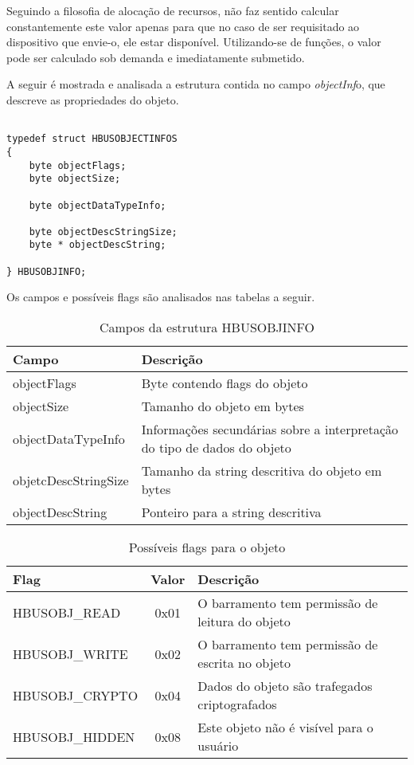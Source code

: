 Seguindo a filosofia de alocação de recursos, não faz sentido calcular constantemente este valor apenas para que no caso de ser requisitado ao dispositivo que envie-o, ele estar disponível. Utilizando-se de funções, o valor pode ser calculado sob demanda e imediatamente submetido.

\vskip1cm

A seguir é mostrada e analisada a estrutura contida no campo \textit{objectInf}o, que descreve as propriedades do objeto.

\pagebreak

\begin{verbatim}

typedef struct HBUSOBJECTINFOS
{
	byte objectFlags;
	byte objectSize;
	
	byte objectDataTypeInfo;
	
	byte objectDescStringSize;
	byte * objectDescString;
	
} HBUSOBJINFO;

\end{verbatim}

Os campos e possíveis flags são analisados nas tabelas a seguir.

\begin{table}[H]
\centering
\caption{Campos da estrutura HBUSOBJINFO}
\begin{tabular}{l p{10cm}}

\hline
Campo					&	Descrição\\
\hline
objectFlags				&	Byte contendo flags do objeto\\
objectSize				&	Tamanho do objeto em bytes\\
objectDataTypeInfo		&	Informações secundárias sobre a interpretação do tipo de dados do objeto\\
objetcDescStringSize		&	Tamanho da string descritiva do objeto em bytes\\
objectDescString			&	Ponteiro para a string descritiva\\
\hline

\end{tabular}
\end{table}

\begin{table}[H]
\centering
\caption{Possíveis flags para o objeto}
\begin{tabular}{l c l}

\hline
Flag						& 	Valor	&	Descrição\\
\hline
HBUSOBJ\_READ			&	0x01		&	O barramento tem permissão de leitura do objeto\\
HBUSOBJ\_WRITE			&	0x02		&	O barramento tem permissão de escrita no objeto\\
HBUSOBJ\_CRYPTO			&   0x04	    &	Dados do objeto são trafegados criptografados\\
HBUSOBJ\_HIDDEN			&	0x08		&	Este objeto não é visível para o usuário\\
\hline

\end{tabular}
\end{table}

